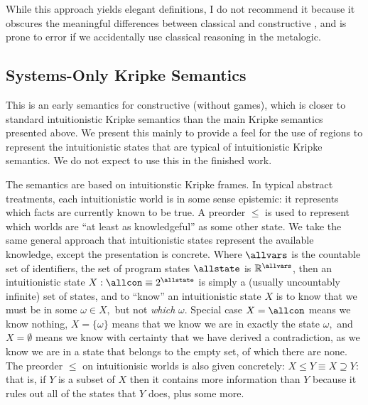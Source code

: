 While this approach yields elegant definitions, I do not recommend it because it obscures the meaningful differences between classical and constructive \dGL, and is prone to error if we accidentally use classical reasoning in the metalogic.

\subsection{Systems-Only Kripke Semantics}
This is an early semantics for constructive \dL (without games), which is closer to standard intuitionistic Kripke semantics than the main Kripke semantics presented above.
We present this mainly to provide a feel for the use of regions to represent the intuitionistic states that are typical of intuitionistic Kripke semantics.
We do not expect to use this in the finished work.

The semantics are based on intuitionstic Kripke frames.
In typical abstract treatments, each intuitionistic world is in some sense epistemic: it represents which facts are currently known to be true.
A preorder $\leq$ is used to represent which worlds are ``at least as knowledgeful'' as some other state.
We take the same general approach that intuitionistic states represent the available knowledge, except the presentation is concrete.
Where $\allvars$ is the countable set of identifiers, the set of program states $\allstate$ is $\mathbb{R}^\allvars$, then an intuitionistic state $X : \allcon \equiv 2^\allstate$ is simply a (usually uncountably infinite) set of states, and to ``know'' an intuitionistic state $X$ is to know that we must be in some $\omega \in X,$ but not \emph{which} $\omega$.
Special case $X = \allcon$ means we know nothing, $X = \{\omega\}$ means that we know we are in exactly the state $\omega,$ and $X = \emptyset$ means we know with certainty that we have derived a contradiction, as we know we are in a state that belongs to the empty set, of which there are none.
The preorder $\leq$ on intuitionisic worlds is also given concretely: $X \leq Y \equiv X \supseteq Y$: that is, if $Y$ is a subset of $X$ then it contains more information than $Y$ because it rules out all of the states that $Y$ does, plus some more.


